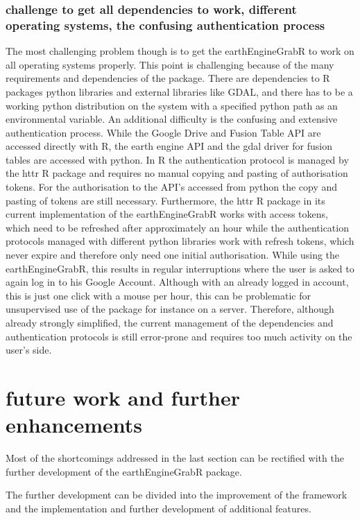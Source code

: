 \subsubsection{challenge to get all dependencies to work, different operating systems, the confusing authentication process}

The most challenging problem though is to get the earthEngineGrabR to work on all operating systems properly. This point is challenging because of the many requirements and dependencies of the package. There are dependencies to R packages python libraries and external libraries like GDAL, and there has to be a working python distribution on the system with a specified python path as an environmental variable. An additional difficulty is the confusing and extensive authentication process. While the Google Drive and Fusion Table API are accessed directly with R, the earth engine API and the gdal driver for fusion tables are accessed with python. In R the authentication protocol is managed by the httr R package and requires no manual copying and pasting of authorisation tokens. For the authorisation to the API's accessed from python the copy and pasting of tokens are still necessary. 
Furthermore, the httr R package in its current implementation of the earthEngineGrabR works with access tokens, which need to be refreshed after approximately an hour while the authentication protocols managed with different python libraries work with refresh tokens, which never expire and therefore only need one initial authorisation. While using the earthEngineGrabR, this results in regular interruptions where the user is asked to again log in to his Google Account. Although with an already logged in account, this is just one click with a mouse per hour, this can be problematic for unsupervised use of the package for instance on a  server. Therefore, although already strongly simplified, the current management of the dependencies and authentication protocols is still error-prone and requires too much activity on the user's side.

\section{future work and further enhancements}

Most of the shortcomings addressed in the last section can be rectified with the further development of the earthEngineGrabR package. 

The further development can be divided into the improvement of the framework and the implementation and further development of additional features.

